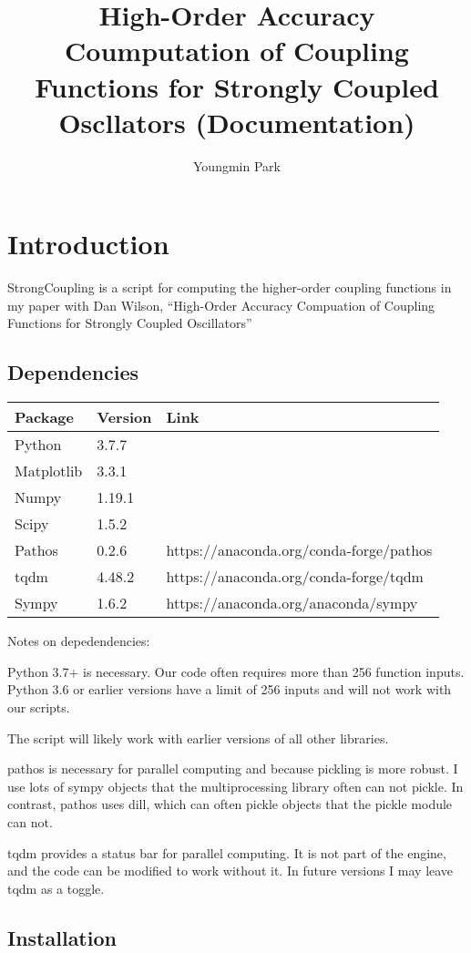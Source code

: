 \documentclass[
  english,
  a4paper,
  oneside]{article}
\title{High-Order Accuracy Coumputation of Coupling Functions for Strongly
Coupled Oscllators (Documentation)}
\author{Youngmin Park}
\date{}
\begin{document}
\maketitle

{
\hypersetup{linkcolor=}
\setcounter{tocdepth}{4}
\tableofcontents
}
\hypertarget{introduction}{%
\section{Introduction}\label{introduction}}

StrongCoupling is a script for computing the higher-order coupling
functions in my paper with Dan Wilson, ``High-Order Accuracy Compuation
of Coupling Functions for Strongly Coupled Oscillators''

\hypertarget{dependencies}{%
\subsection{Dependencies}\label{dependencies}}

\begin{longtable}[]{@{}lll@{}}
\toprule
Package & Version & Link\tabularnewline
\midrule
\endhead
Python & 3.7.7 &\tabularnewline
Matplotlib & 3.3.1 &\tabularnewline
Numpy & 1.19.1 &\tabularnewline
Scipy & 1.5.2 &\tabularnewline
Pathos & 0.2.6 & https://anaconda.org/conda-forge/pathos\tabularnewline
tqdm & 4.48.2 & https://anaconda.org/conda-forge/tqdm\tabularnewline
Sympy & 1.6.2 & https://anaconda.org/anaconda/sympy\tabularnewline
\bottomrule
\end{longtable}

Notes on depedendencies:

Python 3.7+ is necessary. Our code often requires more than 256 function
inputs. Python 3.6 or earlier versions have a limit of 256 inputs and
will not work with our scripts.

The script will likely work with earlier versions of all other
libraries.

pathos is necessary for parallel computing and because pickling is more
robust. I use lots of sympy objects that the multiprocessing library
often can not pickle. In contrast, pathos uses dill, which can often
pickle objects that the pickle module can not.

tqdm provides a status bar for parallel computing. It is not part of the
engine, and the code can be modified to work without it. In future
versions I may leave tqdm as a toggle.

\hypertarget{installation}{%
\subsection{Installation}\label{installation}}
\end{document}
